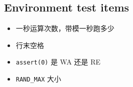 \subsection{Environment test items}

\begin{itemize}
    \item 一秒运算次数，带模一秒跑多少
    \item 行末空格
    \item \verb|assert(0)| 是 WA 还是 RE
    \item \verb|RAND_MAX| 大小
\end{itemize}
